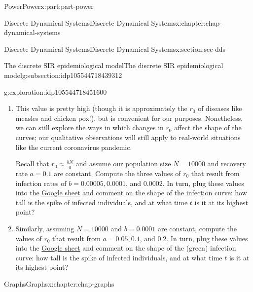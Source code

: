 \documentclass[oneside,10pt,]{book}
\numberwithin{equation}{section}
\begin{document}
\begin{partptx}{Power}{}{Power}{}{}{x:part:part-power}
\begin{chapterptx}{Discrete Dynamical Systems}{}{Discrete Dynamical Systems}{}{}{x:chapter:chap-dynamical-systems}
\begin{sectionptx}{Discrete Dynamical Systems}{}{Discrete Dynamical Systems}{}{}{x:section:sec-dds}
\begin{subsectionptx}{The discrete SIR epidemiological model}{}{The discrete SIR epidemiological model}{}{}{g:subsection:idp105544718439312}
\begin{exploration}{}{g:exploration:idp105544718451600}
\begin{enumerate}
\item{}This value is pretty high (though it is approximately the \(r_0\) of diseases like measles and chicken pox!), but is convenient for our purposes. Nonetheless, we can still explore the ways in which changes in \(r_0\) affect the shape of the curves; our qualitative observations will still apply to real-world situations like the current coronavirus pandemic.%
\par
Recall that \(r_0 \approx \frac{bN}{a}\) and assume our population size \(N = 10000\) and recovery rate \(a = 0.1\) are constant. Compute the three values of \(r_0\) that result from infection rates of \(b = 0.00005, 0.0001\), and \(0.0002\). In turn, plug these values into the \href{https://drive.google.com/file/d/1xSJ6KM8x9HVdo9-P4QoUOoSmmfpKmmIQ/view?usp=sharing}{Google sheet}\footnotemark{} and comment on the shape of the infection curve: how tall is the spike of infected individuals, and at what time \(t\) is it at its highest point?%
\item{}Similarly, assuming \(N = 10000\) and \(b = 0.0001\) are constant, compute the values of \(r_0\) that result from \(a = 0.05, 0.1\), and \(0.2\). In turn, plug these values into the \href{https://drive.google.com/file/d/1xSJ6KM8x9HVdo9-P4QoUOoSmmfpKmmIQ/view?usp=sharing}{Google sheet}\footnotemark{} and comment on the shape of the (green) infection curve: how tall is the spike of infected individuals, and at what time \(t\) is it at its highest point?%
\end{enumerate}
\end{exploration}%
%
%
%
\end{subsectionptx}
\end{sectionptx}
\end{chapterptx}
%
\typeout{************************************************}
\typeout{************************************************}
%
\begin{chapterptx}{Graphs}{}{Graphs}{}{}{x:chapter:chap-graphs}
%
%
\typeout{************************************************}
\typeout{************************************************}

\end{chapterptx}
\end{partptx}
\end{document}
